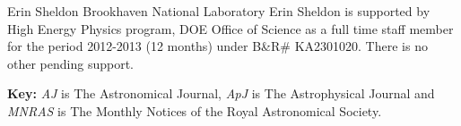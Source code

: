 \documentclass[12pt]{article}
\begin{document}
Erin Sheldon\newline
Brookhaven National Laboratory\newline
\newline
Erin Sheldon is supported by High Energy Physics program, DOE Office of Science
as a full time staff member for the period 2012-2013 (12 months) under B\&R\# KA2301020.
\newline
\newline
\noindent
There is no other pending support. 

\newpage
{}
\renewcommand{\refname}{\section*{Appendix 3: Bibliography for Narrative}\label{app:bib}}


\vspace{5mm}
\noindent
{\bf Key:} {\it AJ} is The Astronomical Journal, {\it ApJ} is The 
Astrophysical Journal and {\it MNRAS} is The Monthly Notices of the Royal
Astronomical Society.
\end{document}
